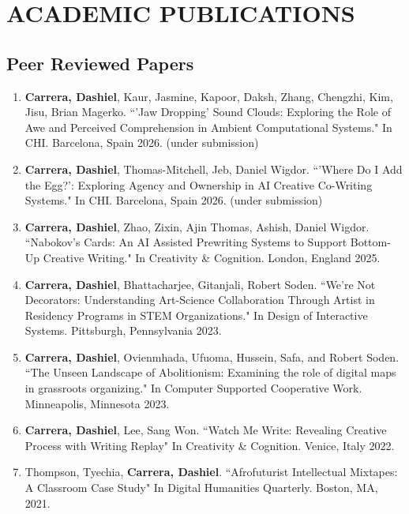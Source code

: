\section{ACADEMIC PUBLICATIONS}

\subsection{Peer Reviewed Papers}
 \begin{enumerate}
  
 
 
   \item \textbf{Carrera, Dashiel}, Kaur, Jasmine, Kapoor, Daksh, Zhang, Chengzhi, Kim, Jisu, Brian Magerko. ``'Jaw Dropping' Sound Clouds: Exploring the Role of Awe and Perceived Comprehension in Ambient Computational Systems." In CHI. Barcelona, Spain 2026. (under submission) \\
 
  \item \textbf{Carrera, Dashiel}, Thomas-Mitchell, Jeb, Daniel Wigdor. ``'Where Do I Add the Egg?': Exploring Agency and Ownership in AI Creative Co-Writing Systems." In CHI. Barcelona, Spain 2026. (under submission) \\
  
   
  \item \textbf{Carrera, Dashiel}, Zhao, Zixin, Ajin Thomas, Ashish, Daniel Wigdor. ``Nabokov's Cards: An AI Assisted Prewriting Systems to Support Bottom-Up Creative Writing." In Creativity \& Cognition. London, England 2025. \\
  \item \textbf{Carrera, Dashiel}, Bhattacharjee, Gitanjali, Robert Soden. ``We're Not Decorators: Understanding Art-Science Collaboration Through Artist in Residency Programs in STEM Organizations." In Design of Interactive Systems. Pittsburgh, Pennsylvania 2023. \\
  \item \textbf{Carrera, Dashiel}, Ovienmhada, Ufuoma, Hussein, Safa, and Robert Soden. ``The Unseen Landscape of Abolitionism: Examining the role of digital maps in
grassroots organizing."  In Computer Supported Cooperative Work. Minneapolis, Minnesota 2023.\\
  \item \textbf{Carrera, Dashiel}, Lee, Sang Won. ``Watch Me Write: Revealing Creative Process with Writing Replay" In Creativity \& Cognition. Venice, Italy 2022. \\
  \item Thompson, Tyechia, \textbf{Carrera, Dashiel}. ``Afrofuturist Intellectual Mixtapes: A Classroom Case Study" In Digital Humanities Quarterly. Boston, MA, 2021.\
 \end{enumerate}

